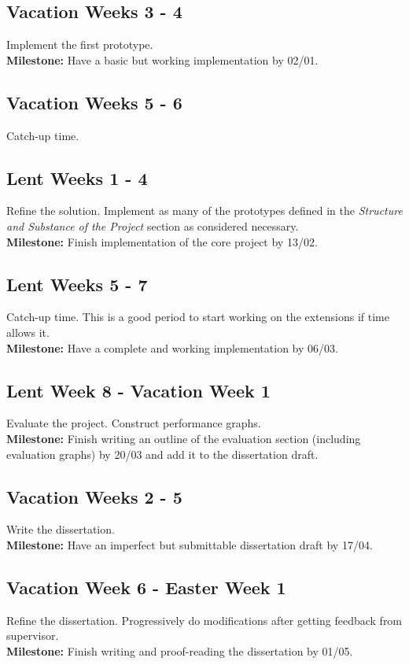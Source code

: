 \subsection*{Vacation Weeks 3 - 4}
Implement the first prototype.\\
{\bf Milestone:} Have a basic but working implementation by 02/01.
	
\subsection*{Vacation Weeks 5 - 6}
Catch-up time.	

\subsection*{Lent Weeks 1 - 4}
Refine the solution. Implement as many of the prototypes defined in the \emph{Structure and Substance of the Project} section as considered necessary.\\ 
{\bf Milestone:} Finish implementation of the core project by 13/02.

\subsection*{Lent Weeks 5 - 7}
Catch-up time. This is a good period to start working on the extensions if time allows it.\\
{\bf Milestone:} Have a complete and working implementation by 06/03.

\subsection*{Lent Week 8 - Vacation Week 1}
Evaluate the project. Construct performance graphs.\\
{\bf Milestone:} Finish writing an outline of the evaluation section (including evaluation graphs) by 20/03 and add it to the dissertation draft.

\subsection*{Vacation Weeks 2 - 5}
Write the dissertation.\\
{\bf Milestone:} Have an imperfect but submittable dissertation draft by 17/04.

\subsection*{Vacation Week 6 - Easter Week 1}
Refine the dissertation. Progressively do modifications after getting feedback from supervisor.\\
{\bf Milestone:} Finish writing and proof-reading the dissertation by 01/05.

